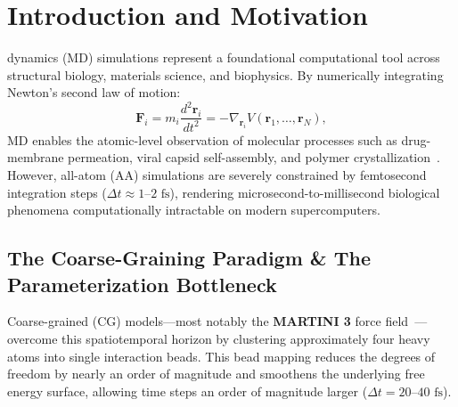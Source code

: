 \documentclass[10pt,journal,compsoc]{IEEEtran}
\begin{document}
\maketitle
\IEEEdisplaynontitleabstractindextext
\IEEEpeerreviewmaketitle

\section{Introduction and Motivation}
\label{sec:intro}

 dynamics (MD) simulations represent a foundational computational tool across structural biology, materials science, and biophysics. By numerically integrating Newton's second law of motion:
\begin{equation}
\mathbf{F}_i = m_i \frac{d^2 \mathbf{r}_i}{dt^2} = -\nabla_{\mathbf{r}_i} V(\mathbf{r}_1, \dots, \mathbf{r}_N),
\label{eq:newton}
\end{equation}
MD enables the atomic-level observation of molecular processes such as drug-membrane permeation, viral capsid self-assembly, and polymer crystallization~\cite{souza2021martini3,tuckerman2010statistical}. However, all-atom (AA) simulations are severely constrained by femtosecond integration steps ($\Delta t \approx 1\text{--}2\text{ fs}$), rendering microsecond-to-millisecond biological phenomena computationally intractable on modern supercomputers.

\subsection{The Coarse-Graining Paradigm \& The Parameterization Bottleneck}
Coarse-grained (CG) models---most notably the \textbf{MARTINI 3} force field~\cite{souza2021martini3}---overcome this spatiotemporal horizon by clustering approximately four heavy atoms into single interaction beads. This bead mapping reduces the degrees of freedom by nearly an order of magnitude and smoothens the underlying free energy surface, allowing time steps an order of magnitude larger ($\Delta t = 20\text{--}40\text{ fs}$).
\end{document}
